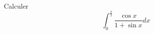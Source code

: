 Calculer
\begin{displaymath}
 \int_{0}^{\frac{\pi}{2}}\frac{\cos x}{1+\sin x}dx
\end{displaymath}
\bigskip
